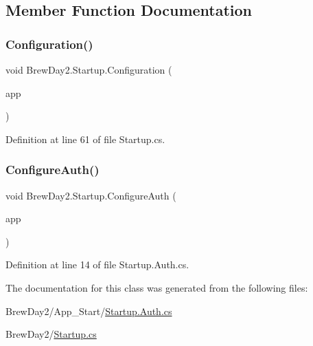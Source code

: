 \subsection{Member Function Documentation}
\mbox{\label{class_brew_day2_1_1_startup_aaee855f3979e32e08654f02e62041b4c}} 
\subsubsection{\texorpdfstring{Configuration()}{Configuration()}}
{\footnotesize\ttfamily void Brew\+Day2.\+Startup.\+Configuration (\begin{DoxyParamCaption}\item[{I\+App\+Builder}]{app }\end{DoxyParamCaption})}



Definition at line 61 of file Startup.\+cs.

\mbox{\label{class_brew_day2_1_1_startup_a8888284c28425eae2cebe3de8541cbe1}} 
\subsubsection{\texorpdfstring{Configure\+Auth()}{ConfigureAuth()}}
{\footnotesize\ttfamily void Brew\+Day2.\+Startup.\+Configure\+Auth (\begin{DoxyParamCaption}\item[{I\+App\+Builder}]{app }\end{DoxyParamCaption})}



Definition at line 14 of file Startup.\+Auth.\+cs.



The documentation for this class was generated from the following files\+:\begin{DoxyCompactItemize}
\item 
Brew\+Day2/\+App\+\_\+\+Start/\mbox{\hyperlink{_startup_8_auth_8cs}{Startup.\+Auth.\+cs}}\item 
Brew\+Day2/\mbox{\hyperlink{_startup_8cs}{Startup.\+cs}}\end{DoxyCompactItemize}

